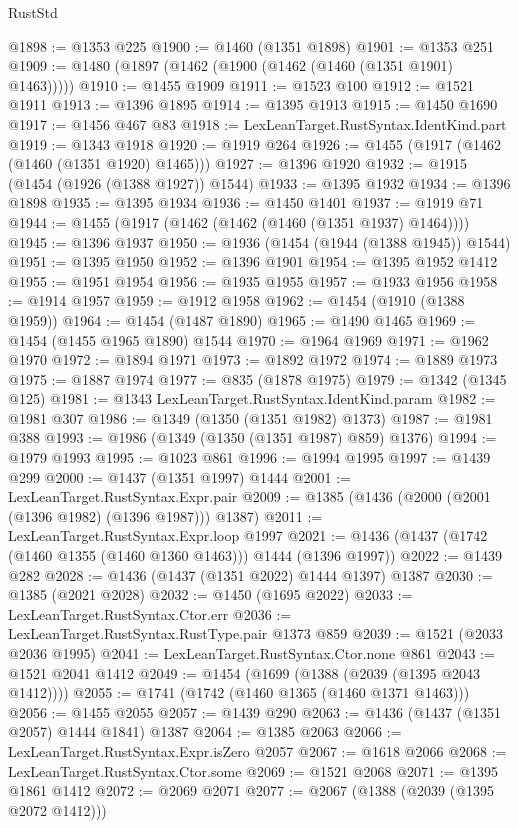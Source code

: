 \begin{lexlean}{RustStd}
\begin{coremodule}
{\begin{coremodule}
{{{{{{{{{{@1898 := @1353 @225
@1900 := @1460 (@1351 @1898)
@1901 := @1353 @251
@1909 := @1480 (@1897 (@1462 (@1900 (@1462 (@1460 (@1351 @1901) @1463)))))
@1910 := @1455 @1909
@1911 := @1523 @100
@1912 := @1521 @1911
@1913 := @1396 @1895
@1914 := @1395 @1913
@1915 := @1450 @1690
@1917 := @1456 @467 @83
@1918 := LexLeanTarget.RustSyntax.IdentKind.part
@1919 := @1343 @1918
@1920 := @1919 @264
@1926 := @1455 (@1917 (@1462 (@1460 (@1351 @1920) @1465)))
@1927 := @1396 @1920
@1932 := @1915 (@1454 (@1926 (@1388 @1927)) @1544)
@1933 := @1395 @1932
@1934 := @1396 @1898
@1935 := @1395 @1934
@1936 := @1450 @1401
@1937 := @1919 @71
@1944 := @1455 (@1917 (@1462 (@1462 (@1460 (@1351 @1937) @1464))))
@1945 := @1396 @1937
@1950 := @1936 (@1454 (@1944 (@1388 @1945)) @1544)
@1951 := @1395 @1950
@1952 := @1396 @1901
@1954 := @1395 @1952 @1412
@1955 := @1951 @1954
@1956 := @1935 @1955
@1957 := @1933 @1956
@1958 := @1914 @1957
@1959 := @1912 @1958
@1962 := @1454 (@1910 (@1388 @1959))
@1964 := @1454 (@1487 @1890)
@1965 := @1490 @1465
@1969 := @1454 (@1455 @1965 @1890) @1544
@1970 := @1964 @1969
@1971 := @1962 @1970
@1972 := @1894 @1971
@1973 := @1892 @1972
@1974 := @1889 @1973
@1975 := @1887 @1974
@1977 := @835 (@1878 @1975)
@1979 := @1342 (@1345 @125)
@1981 := @1343 LexLeanTarget.RustSyntax.IdentKind.param
@1982 := @1981 @307
@1986 := @1349 (@1350 (@1351 @1982) @1373)
@1987 := @1981 @388
@1993 := @1986 (@1349 (@1350 (@1351 @1987) @859) @1376)
@1994 := @1979 @1993
@1995 := @1023 @861
@1996 := @1994 @1995
@1997 := @1439 @299
@2000 := @1437 (@1351 @1997) @1444
@2001 := LexLeanTarget.RustSyntax.Expr.pair
@2009 := @1385 (@1436 (@2000 (@2001 (@1396 @1982) (@1396 @1987))) @1387)
@2011 := LexLeanTarget.RustSyntax.Expr.loop @1997
@2021 := @1436 (@1437 (@1742 (@1460 @1355 (@1460 @1360 @1463))) @1444 (@1396 @1997))
@2022 := @1439 @282
@2028 := @1436 (@1437 (@1351 @2022) @1444 @1397) @1387
@2030 := @1385 (@2021 @2028)
@2032 := @1450 (@1695 @2022)
@2033 := LexLeanTarget.RustSyntax.Ctor.err
@2036 := LexLeanTarget.RustSyntax.RustType.pair @1373 @859
@2039 := @1521 (@2033 @2036 @1995)
@2041 := LexLeanTarget.RustSyntax.Ctor.none @861
@2043 := @1521 @2041 @1412
@2049 := @1454 (@1699 (@1388 (@2039 (@1395 @2043 @1412))))
@2055 := @1741 (@1742 (@1460 @1365 (@1460 @1371 @1463)))
@2056 := @1455 @2055
@2057 := @1439 @290
@2063 := @1436 (@1437 (@1351 @2057) @1444 @1841) @1387
@2064 := @1385 @2063
@2066 := LexLeanTarget.RustSyntax.Expr.isZero @2057
@2067 := @1618 @2066
@2068 := LexLeanTarget.RustSyntax.Ctor.some
@2069 := @1521 @2068
@2071 := @1395 @1861 @1412
@2072 := @2069 @2071
@2077 := @2067 (@1388 (@2039 (@1395 @2072 @1412)))
}}}}}}}}}}
\end{coremodule}}
\end{coremodule}
\end{lexlean}
